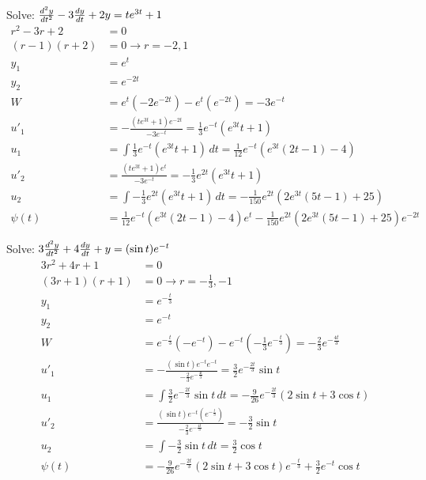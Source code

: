 \documentclass[12pt]{article}
\begin{document}
\begin{example} Solve: $\frac{d^2y}{dt^2} - 3\frac{dy}{dt}+ 2y = te^{3t} + 1$
$$\begin{aligned} 
r^2 - 3r + 2 &= 0 \\ (r - 1)(r + 2) &= 0 \to r = -2, 1 \\ 
y_1 &= e^t \\ y_2 &= e^{-2t} \\ 
W &= e^t(-2e^{-2t}) - e^t(e^{-2t}) = -3e^{-t} \\ 
u'_1 &= -\frac{(te^{3t} + 1)e^{-2t}}{-3e^{-t}} = \frac{1}{3}e^{-t}(e^{3t}t + 1) \\
u_1 &= \int \frac{1}{3}e^{-t}(e^{3t}t + 1) \, dt = \frac{1}{12}e^{-t}(e^{3t}(2t - 1) - 4) \\ 
u'_2 &= \frac{(te^{3t} + 1)e^t}{-3e^{-t}} = -\frac{1}{3}e^{2t}(e^{3t}t + 1) \\
u_2 &= \int -\frac{1}{3}e^{2t}(e^{3t}t + 1) \, dt = -\frac{1}{150}e^{2t}(2e^{3t}(5t - 1) + 25) \\ 
\psi(t) &= \frac{1}{12}e^{-t}(e^{3t}(2t - 1) - 4)e^t - \frac{1}{150}e^{2t}(2e^{3t}(5t - 1) + 25)e^{-2t} \end{aligned} $$\end{example} 

\begin{example} Solve: $3\frac{d^2y}{dt^2} + 4\frac{dy}{dt}+ y = (\sin t)e^{-t}$
$$\begin{aligned} 
3r^2 + 4r + 1 &= 0 \\ (3r + 1)(r + 1) &= 0 \to r = -\frac{1}{3}, -1 \\
y_1 &= e^{-\frac{t}{3}} \\ y_2 &= e^{-t} \\ 
W &= e^{-\frac{t}{3}}(-e^{-t}) - e^{-t}(-\frac{1}{3}e^{-\frac{t}{3}}) = -\frac{2}{3}e^{-\frac{4t}{3}} \\ 
u'_1 &= -\frac{(\sin t)e^{-t}e^{-t}}{-\frac{2}{3}e^{-\frac{4t}{3}}} = \frac{3}{2}e^{-\frac{2t}{3}}\sin t \\
u_1 &= \int \frac{3}{2}e^{-\frac{2t}{3}}\sin t \, dt = -\frac{9}{26}e^{-\frac{2t}{3}}(2\sin t + 3\cos t) \\ 
u'_2 &= \frac{(\sin t)e^{-t}(e^{-\frac{t}{3}})}{-\frac{2}{3}e^{-\frac{4t}{3}}} = -\frac{3}{2}\sin t \\ 
u_2 &= \int -\frac{3}{2}\sin t \, dt = \frac{3}{2}\cos t \\ 
\psi(t) &= -\frac{9}{26}e^{-\frac{2t}{3}}(2\sin t + 3\cos t)e^{-\frac{t}{3}} + \frac{3}{2}e^{-t}\cos t \end{aligned} $$ \end{example} 
\end{document}
